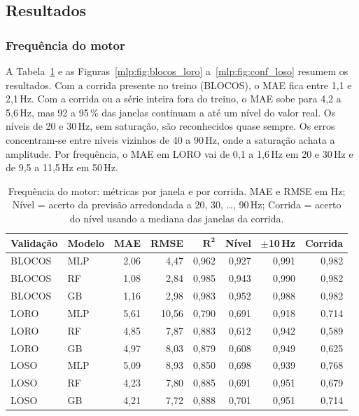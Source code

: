 \subsection{Resultados}
\label{mlp:sec:resultados}

\subsubsection{Frequência do motor}

A Tabela~\ref{mlp:tab:freq} e as Figuras~\ref{mlp:fig:blocos_loro} a~\ref{mlp:fig:conf_loso} resumem os resultados. Com a corrida presente no treino (BLOCOS), o MAE fica entre 1,1 e 2,1\,Hz. Com a corrida ou a série inteira fora do treino, o MAE sobe para 4,2 a 5,6\,Hz, mas 92 a 95\,\% das janelas continuam a até um nível do valor real. Os níveis de 20 e 30\,Hz, sem saturação, são reconhecidos quase sempre. Os erros concentram-se entre níveis vizinhos de 40 a 90\,Hz, onde a saturação achata a amplitude. Por frequência, o MAE em LORO vai de 0,1 a 1,6\,Hz em 20 e 30\,Hz e de 9,5 a 11,5\,Hz em 50\,Hz.

\begin{table}[htbp]
	\centering
	\caption{Frequência do motor: métricas por janela e por corrida. MAE e RMSE em Hz; Nível = acerto da previsão arredondada a 20, 30, \ldots, 90\,Hz; Corrida = acerto do nível usando a mediana das janelas da corrida.}
	\label{mlp:tab:freq}
	\small
	\begin{tabular}{llrrrrrr}
		\toprule
		\textbf{Validação} & \textbf{Modelo} & \textbf{MAE} & \textbf{RMSE} & \(\boldsymbol{R^2}\) & \textbf{Nível} & \(\boldsymbol{\pm}\)\textbf{10\,Hz} & \textbf{Corrida} \\
		\midrule
		BLOCOS & MLP & 2,06 & 4,47 & 0,962 & 0,927 & 0,991 & 0,982 \\
		BLOCOS & RF & 1,08 & 2,84 & 0,985 & 0,943 & 0,990 & 0,982 \\
		BLOCOS & GB & 1,16 & 2,98 & 0,983 & 0,952 & 0,988 & 0,982 \\
		\midrule
		LORO & MLP & 5,61 & 10,56 & 0,790 & 0,691 & 0,918 & 0,714 \\
		LORO & RF & 4,85 & 7,87 & 0,883 & 0,612 & 0,942 & 0,589 \\
		LORO & GB & 4,97 & 8,03 & 0,879 & 0,608 & 0,949 & 0,625 \\
		\midrule
		LOSO & MLP & 5,09 & 8,93 & 0,850 & 0,698 & 0,939 & 0,768 \\
		LOSO & RF & 4,23 & 7,80 & 0,885 & 0,691 & 0,951 & 0,679 \\
		LOSO & GB & 4,21 & 7,72 & 0,888 & 0,701 & 0,951 & 0,714 \\
		\bottomrule
	\end{tabular}
\end{table}

